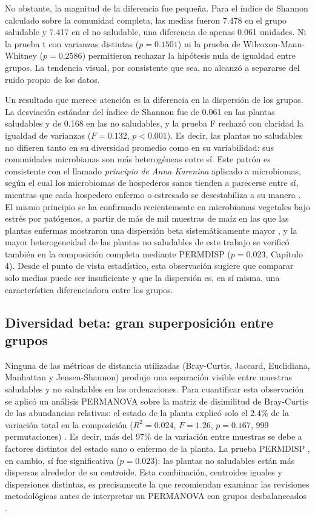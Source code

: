 No obstante, la magnitud de la diferencia fue pequeña. Para el índice de Shannon calculado sobre la
comunidad completa, las medias fueron 7.478 en el grupo saludable y 7.417 en el no saludable, una
diferencia de apenas 0.061 unidades. Ni la prueba t con varianzas distintas ($p = 0.1501$) ni la
prueba de Wilcoxon-Mann-Whitney ($p = 0.2586$) permitieron rechazar la hipótesis nula de igualdad
entre grupos. La tendencia visual, por consistente que sea, no alcanzó a separarse del ruido propio
de los datos.

Un resultado que merece atención es la diferencia en la dispersión de los grupos. La desviación
estándar del índice de Shannon fue de 0.061 en las plantas saludables y de 0.168 en las no
saludables, y la prueba F rechazó con claridad la igualdad de varianzas ($F = 0.132$,
$p < 0.001$). Es decir, las plantas no saludables no difieren tanto en su diversidad promedio como
en su variabilidad: sus comunidades microbianas son más heterogéneas entre sí. Este patrón es
consistente con el llamado \emph{principio de Anna Karenina} aplicado a microbiomas, según el cual
los microbiomas de hospederos sanos tienden a parecerse entre sí, mientras que cada hospedero
enfermo o estresado se desestabiliza a su manera \citep{zaneveld2017stress}. El mismo principio se ha
confirmado recientemente en microbiomas vegetales bajo estrés por patógenos, a partir de más de mil
muestras de maíz en las que las plantas enfermas mostraron una dispersión beta sistemáticamente mayor
\citep{li2026anna}, y la mayor heterogeneidad de las plantas no saludables de este trabajo se verificó
también en la composición completa mediante PERMDISP ($p = 0.023$, Capítulo 4). Desde el punto de
vista estadístico, esta observación sugiere que comparar solo medias puede ser insuficiente y que la
dispersión es, en sí misma, una característica diferenciadora entre los grupos.

\subsection{Diversidad beta: gran superposición entre grupos}

Ninguna de las métricas de distancia utilizadas (Bray-Curtis, Jaccard, Euclidiana, Manhattan y
Jensen-Shannon) produjo una separación visible entre muestras saludables y no saludables en las
ordenaciones. Para cuantificar esta observación se aplicó un análisis PERMANOVA sobre la matriz de
disimilitud de Bray-Curtis de las abundancias relativas: el estado de la planta explicó solo el
2.4\% de la variación total en la composición ($R^2 = 0.024$, $F = 1.26$, $p = 0.167$, 999
permutaciones) \citep{anderson2001new, anderson2011navigating}. Es decir, más del 97\% de la
variación entre muestras se debe a factores distintos del estado sano o enfermo de la planta. La
prueba PERMDISP \citep{anderson2006distance}, en cambio, sí fue significativa ($p = 0.023$): las
plantas no saludables están más dispersas alrededor de su centroide. Esta combinación, centroides
iguales y dispersiones distintas, es precisamente la que recomiendan examinar las revisiones
metodológicas antes de interpretar un PERMANOVA con grupos desbalanceados
\citep{kleinebardenhorst2021data, aldirawi2023univariate}.

